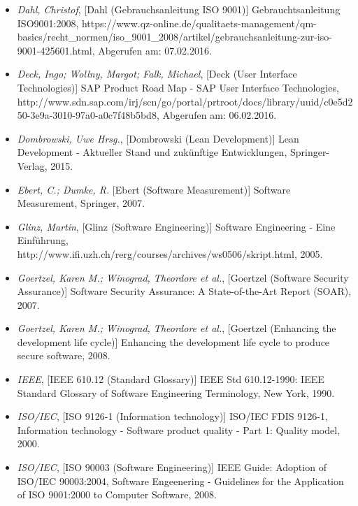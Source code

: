 \begin{itemize}
    \item[] \emph{Dahl, Christof}, [Dahl (Gebrauchsanleitung ISO 9001)] Gebrauchtsanleitung ISO9001:2008, https://www.qz-online.de/qualitaets-management/qm-basics/recht\_normen/iso\_9001\_2008/artikel/gebrauchsanleitung-zur-iso-9001-425601.html, Abgerufen am: 07.02.2016.

    \item[] \emph{Deck, Ingo; Wollny, Margot; Falk, Michael}, [Deck (User Interface Technologies)] SAP Product Road Map - SAP User Interface Technologies, \\ http://www.sdn.sap.com/irj/scn/go/portal/prtroot/docs/library/uuid/c0e5d250-3e9a-3010-97a0-a0c7f48b5bd8, Abgerufen am: 06.02.2016.

    \item[] \emph{Dombrowski, Uwe Hrsg.}, [Dombrowski (Lean Development)] Lean Development - Aktueller Stand und zukünftige Entwicklungen, Springer-Verlag, 2015.

    \item[] \emph{Ebert, C.; Dumke, R.} [Ebert (Software Measurement)] Software Measurement, Springer, 2007.

    \item[] \emph{Glinz, Martin}, [Glinz (Software Engineering)] Software Engineering - Eine Einführung, \\http://www.ifi.uzh.ch/rerg/courses/archives/ws0506/skript.html, 2005.

    \item[] \emph{Goertzel, Karen M.; Winograd, Theordore et al.}, [Goertzel (Software Security Assurance)] Software Security Assurance: A State-of-the-Art Report (SOAR), 2007.

    \item[] \emph{Goertzel, Karen M.; Winograd, Theordore et al.}, [Goertzel (Enhancing the development life cycle)] Enhancing the development life cycle to produce secure software, 2008.

    \item[] \emph{IEEE}, [IEEE 610.12 (Standard Glossary)] IEEE Std 610.12-1990: IEEE Standard Glossary of Software Engineering Terminology, New York, 1990.

    \item[] \emph{ISO/IEC}, [ISO 9126-1 (Information technology)] ISO/IEC FDIS 9126-1, Information technology - Software product quality - Part 1: Quality model, 2000.

    \item[] \emph{ISO/IEC}, [ISO 90003 (Software Engineering)] IEEE Guide: Adoption of ISO/IEC 90003:2004, Software Engeenering - Guidelines for the Application of ISO 9001:2000 to Computer Software, 2008.


\end{itemize}
